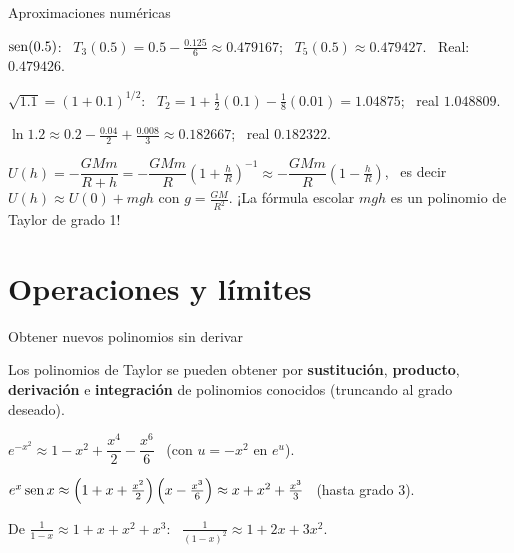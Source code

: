 \documentclass[10pt,aspectratio=169]{beamer}
\begin{document}
\begin{frame}{Aproximaciones numéricas}
  \begin{ejemplo}[3]
    $\operatorname{sen}(0.5)$: \ $T_3(0.5)=0.5-\frac{0.125}6\approx0.479167$; \ $T_5(0.5)\approx0.479427$. \ Real: $0.479426$.
  \end{ejemplo}
  \begin{ejemplo}[4]
    $\sqrt{1.1}=(1+0.1)^{1/2}$: \ $T_2=1+\frac12(0.1)-\frac18(0.01)=1.04875$; \ real $1.048809$.
  \end{ejemplo}
  \begin{ejemplo}[5]
    $\ln1.2\approx0.2-\frac{0.04}{2}+\frac{0.008}{3}\approx0.182667$; \ real $0.182322$.
  \end{ejemplo}
  \begin{ejemplo}
    $U(h)=-\dfrac{GMm}{R+h}=-\dfrac{GMm}{R}\left(1+\frac hR\right)^{-1}\approx-\dfrac{GMm}R\left(1-\frac hR\right)$, \ es decir
    $U(h)\approx U(0)+mgh$ con $g=\frac{GM}{R^2}$. ¡La fórmula escolar $mgh$ es un polinomio de Taylor de grado 1!
  \end{ejemplo}
\end{frame}

\section{Operaciones y límites}

\begin{frame}{Obtener nuevos polinomios sin derivar}
  \begin{proposicion}
    Los polinomios de Taylor se pueden obtener por \textbf{sustitución}, \textbf{producto}, \textbf{derivación} e \textbf{integración}
    de polinomios conocidos (truncando al grado deseado).
  \end{proposicion}
  \begin{ejemplo}[7: sustitución]
    $e^{-x^2}\approx1-x^2+\dfrac{x^4}{2}-\dfrac{x^6}{6}$ \ (con $u=-x^2$ en $e^u$).
  \end{ejemplo}
  \begin{ejemplo}[8: producto]
    $e^x\operatorname{sen} x\approx\left(1+x+\frac{x^2}2\right)\left(x-\frac{x^3}6\right)\approx x+x^2+\frac{x^3}{3}$ \ (hasta grado 3).
  \end{ejemplo}
  \begin{ejemplo}[9: derivación]
    De $\frac{1}{1-x}\approx1+x+x^2+x^3$: \ $\frac{1}{(1-x)^2}\approx1+2x+3x^2$.
  \end{ejemplo}
\end{frame}
\end{document}
